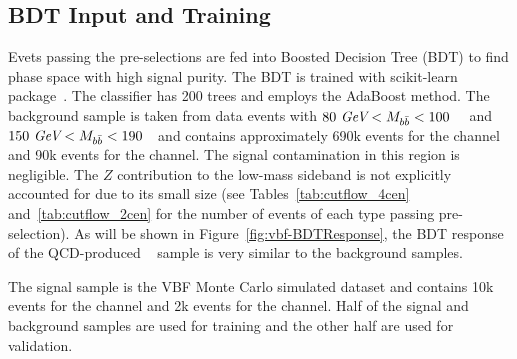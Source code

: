 \label{sec:vbf-bdt}

\subsection{BDT Input and Training}
Evets passing the pre-selections are fed into Boosted Decision Tree (BDT) to find phase space with high signal purity.
The BDT is trained with scikit-learn package~\cite{scikit-learn}.
The classifier has 200 trees and employs the AdaBoost method.
The background sample is taken from data events with $80~\textit{GeV} < M_{b\bar{b}} <100$~\GeV~
and $150~\textit{GeV}<M_{b\bar{b}}<190$~\GeV~and contains approximately 690k events for
the \fourcentral channel and 90k events for the \twocentral channel.
The signal contamination in this region is negligible.
The $Z$ contribution to the low-mass sideband is not explicitly accounted
for due to its small size (see Tables~\ref{tab:cutflow_4cen}
and~\ref{tab:cutflow_2cen} for the number of events of each type passing pre-selection).
As will be shown in Figure~\ref{fig:vbf-BDTResponse},
the BDT response of the QCD-produced \zjets~ sample is very similar to the background samples. 

The signal sample is the VBF Monte Carlo simulated dataset and
contains 10k events for the \fourcentral channel and 2k events for
the \twocentral channel.  Half of the signal and background samples are
used for training and the other half are used for validation.

